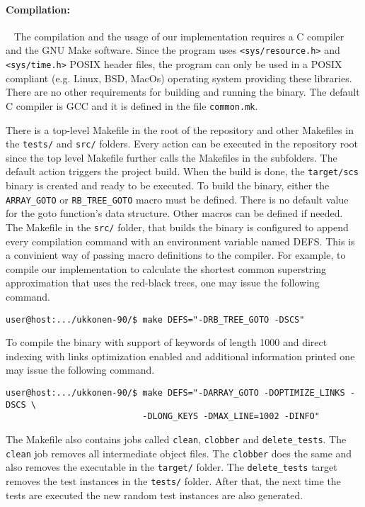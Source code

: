 \documentclass[english,twoside,censored,csm,algorithms-track-2020]{HYthesisML}
\theoremstyle{plain}
\theoremstyle{definition}
\begin{document}

\paragraph{Compilation:}~\label{usage}
The compilation and the usage of our implementation requires a C compiler and the GNU Make software.
Since the program uses \texttt{<sys/resource.h>} and \texttt{<sys/time.h>} POSIX header files,
the program can only
be used in a POSIX compliant (e.g. Linux, BSD, MacOs) operating system providing these libraries.
There are no other
requirements for building and running the binary. The default C compiler is GCC and it is defined in the
file \texttt{common.mk}.

There is a top-level Makefile in the root of the repository and other Makefiles in the \texttt{tests/}
and \texttt{src/} folders. Every action can be executed in the repository root since the top level
Makefile further calls the Makefiles in the subfolders. The default action triggers the project build.
When the build is done, the \texttt{target/scs} binary is created and ready to be executed. To build
the binary, either the \texttt{ARRAY\_GOTO} or \texttt{RB\_TREE\_GOTO} macro must be defined.
There is no default value
for the goto function's data structure. Other macros can be defined if needed.
The Makefile in the \texttt{src/} folder, that builds the binary is configured to append every
compilation command with an environment variable named DEFS. This is a convinient way of passing
macro definitions to the compiler. For example, to compile our implementation to calculate the
shortest common superstring approximation that uses the red-black trees, one may issue the following
command.

\begin{verbatim}
user@host:.../ukkonen-90/$ make DEFS="-DRB_TREE_GOTO -DSCS"
\end{verbatim}

To compile the binary with support of keywords of length 1000 and direct indexing with links
optimization enabled and additional information printed one may issue the following command.

\begin{verbatim}
user@host:.../ukkonen-90/$ make DEFS="-DARRAY_GOTO -DOPTIMIZE_LINKS -DSCS \
                           -DLONG_KEYS -DMAX_LINE=1002 -DINFO"
\end{verbatim}

The Makefile also contains jobs called \texttt{clean}, \texttt{clobber} and \texttt{delete\_tests}.
The \texttt{clean} job removes all
intermediate object files. The \texttt{clobber} does the same and also removes the executable in the
\texttt{target/} folder. The \texttt{delete\_tests} target removes the test instances in the
\texttt{tests/}
folder. After that, the next time the tests are executed the new random test instances are
also generated.
\end{document}
